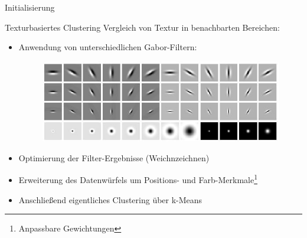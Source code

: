 \documentclass{beamer}
\begin{document}
\begin{frame}{Initialisierung}
\begin{minipage}{0.20\textwidth}
\begin{figure}[h!]
\begin{subfigure}{\textwidth}
			\end{subfigure}
		\end{figure}
	\end{minipage}
\end{frame}

\begin{frame}{Texturbasiertes Clustering}
Vergleich von Textur in benachbarten Bereichen:
	\begin{itemize}
		\item Anwendung von unterschiedlichen Gabor-Filtern:
		\begin{figure}
			\includegraphics[width=.5\textwidth,keepaspectratio]{gfx/vis_01.jpg}
		\end{figure}
		\item Optimierung der Filter-Ergebnisse (Weichnzeichnen)
		\item Erweiterung des Datenwürfels um Positions- und Farb-Merkmale\footnote{Anpassbare Gewichtungen}
		\item Anschließend eigentliches Clustering über k-Means
\end{itemize}
\end{frame}
\end{document}
